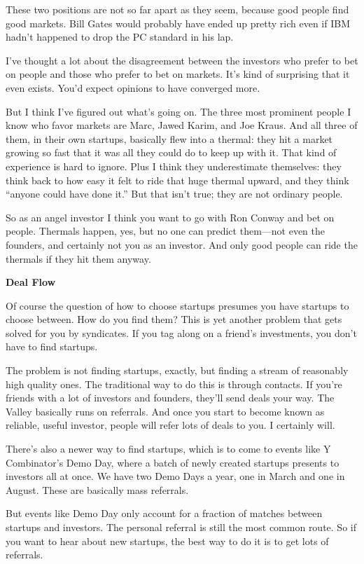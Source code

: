 \documentclass[12pt]{book}
\begin{document}
These two positions are not so far apart as they seem, because good
people find good markets. Bill Gates would probably have ended up pretty
rich even if IBM hadn't happened to drop the PC standard in his lap.

I've thought a lot about the disagreement between the investors who
prefer to bet on people and those who prefer to bet on markets. It's
kind of surprising that it even exists. You'd expect opinions to have
converged more.

But I think I've figured out what's going on. The three most prominent
people I know who favor markets are Marc, Jawed Karim, and Joe Kraus.
And all three of them, in their own startups, basically flew into a
thermal: they hit a market growing so fast that it was all they could do
to keep up with it. That kind of experience is hard to ignore. Plus I
think they underestimate themselves: they think back to how easy it felt
to ride that huge thermal upward, and they think ``anyone could have
done it.'' But that isn't true; they are not ordinary people.

So as an angel investor I think you want to go with Ron Conway and bet
on people. Thermals happen, yes, but no one can predict them---not even
the founders, and certainly not you as an investor. And only good people
can ride the thermals if they hit them anyway.

\textbf{Deal Flow}

Of course the question of how to choose startups presumes you have
startups to choose between. How do you find them? This is yet another
problem that gets solved for you by syndicates. If you tag along on a
friend's investments, you don't have to find startups.

The problem is not finding startups, exactly, but finding a stream of
reasonably high quality ones. The traditional way to do this is through
contacts. If you're friends with a lot of investors and founders,
they'll send deals your way. The Valley basically runs on referrals. And
once you start to become known as reliable, useful investor, people will
refer lots of deals to you. I certainly will.

There's also a newer way to find startups, which is to come to events
like Y Combinator's Demo Day, where a batch of newly created startups
presents to investors all at once. We have two Demo Days a year, one in
March and one in August. These are basically mass referrals.

But events like Demo Day only account for a fraction of matches between
startups and investors. The personal referral is still the most common
route. So if you want to hear about new startups, the best way to do it
is to get lots of referrals.
\end{document}
